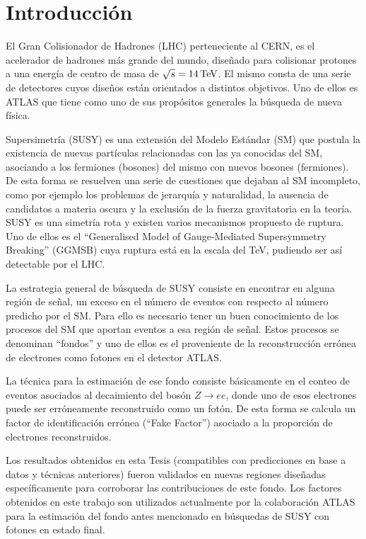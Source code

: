 \chapter*{Introducción}


El Gran Colisionador de Hadrones (LHC) perteneciente al CERN, es el acelerador de hadrones más grande del mundo, diseñado para colisionar protones a una energía de centro de masa de $\sqrt{s}=14\, \mathrm{TeV}$. El mismo consta de una serie de detectores cuyos diseños están orientados a distintos objetivos. Uno de ellos es ATLAS que tiene como uno de sus propósitos generales la búsqueda de nueva física.

Supersimetría (SUSY) es una extensión del Modelo Estándar (SM) que postula la existencia de nuevas partículas relacionadas con las ya conocidas del SM, asociando a los fermiones (bosones) del mismo con nuevos bosones (fermiones). De esta forma se resuelven una serie de cuestiones que dejaban al SM incompleto, como por ejemplo los problemas de jerarquía y naturalidad, la ausencia de candidatos a materia oscura y la exclusión de la fuerza gravitatoria en la teoría. SUSY es una simetría rota y existen varios mecanismos propuesto de ruptura. Uno de ellos es el “Generalised Model of Gauge-Mediated Supersymmetry Breaking” (GGMSB) cuya ruptura está en la escala del TeV, pudiendo ser así detectable por el LHC.

La estrategia general de búsqueda de SUSY consiste en encontrar en alguna región de señal, un exceso en el número de eventos con respecto al número predicho por el SM. Para ello es necesario tener un buen conocimiento de los procesos del SM que aportan eventos a esa región de señal. Estos procesos se denominan “fondos” y uno de ellos es el proveniente de la reconstrucción errónea de electrones como fotones en el detector ATLAS.

La técnica para la estimación de ese fondo consiste básicamente en el conteo de eventos asociados al decaimiento del bosón $Z\rightarrow ee$, donde uno de esos electrones puede ser erróneamente reconstruido como un fotón. De esta forma se calcula un factor de identificación errónea (“Fake Factor”) asociado a la proporción de electrones reconstruidos.

Los resultados obtenidos en esta Tesis (compatibles con predicciones en base a datos y técnicas anteriores) fueron validados en nuevas regiones diseñadas específicamente para corroborar las contribuciones de este fondo. Los factores obtenidos en este trabajo son utilizados actualmente por la colaboración ATLAS para la estimación del fondo antes mencionado en búsquedas de SUSY con fotones en estado final.

\clearpage
